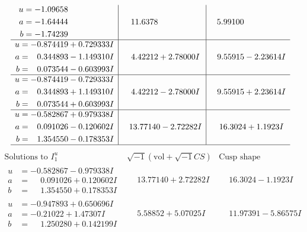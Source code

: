 \documentclass[1p]{elsarticle_modified}
\theoremstyle{definition}
\newcommand{\I}{\sqrt{-1}}
\begin{document}
$$\begin{array}{c|c|c}
\begin{aligned}
u &= -1.09658\phantom{ +0.000000I} \\
a &= -1.64444\phantom{ +0.000000I} \\
b &= -1.74239\phantom{ +0.000000I}\end{aligned}
 & \phantom{-}11.6378\phantom{ +0.000000I} & \phantom{-}5.99100\phantom{ +0.000000I} \\ \hline\begin{aligned}
u &= -0.874419 + 0.729333 I \\
a &= \phantom{-}0.344893 - 1.149310 I \\
b &= \phantom{-}0.073544 - 0.603993 I\end{aligned}
 & \phantom{-}4.42212 + 2.78000 I & \phantom{-}9.55915 - 2.23614 I \\ \hline\begin{aligned}
u &= -0.874419 - 0.729333 I \\
a &= \phantom{-}0.344893 + 1.149310 I \\
b &= \phantom{-}0.073544 + 0.603993 I\end{aligned}
 & \phantom{-}4.42212 - 2.78000 I & \phantom{-}9.55915 + 2.23614 I \\ \hline\begin{aligned}
u &= -0.582867 + 0.979338 I \\
a &= \phantom{-}0.091026 - 0.120602 I \\
b &= \phantom{-}1.354550 - 0.178353 I\end{aligned}
 & \phantom{-}13.77140 - 2.72282 I & \phantom{-}16.3024 + 1.1923 I\\
 \hline 
 \end{array}$$\newpage$$\begin{array}{c|c|c}  
\text{Solutions to }I^u_{1}& \I (\text{vol} + \sqrt{-1}CS) & \text{Cusp shape}\\
 \hline 
\begin{aligned}
u &= -0.582867 - 0.979338 I \\
a &= \phantom{-}0.091026 + 0.120602 I \\
b &= \phantom{-}1.354550 + 0.178353 I\end{aligned}
 & \phantom{-}13.77140 + 2.72282 I & \phantom{-}16.3024 - 1.1923 I \\ \hline\begin{aligned}
u &= -0.947893 + 0.650696 I \\
a &= -0.21022 + 1.47307 I \\
b &= \phantom{-}1.250280 + 0.142199 I\end{aligned}
 & \phantom{-}5.58852 + 5.07025 I & \phantom{-}11.97391 - 5.86575 I \\ \hline\begin{aligned}

\end{aligned}
\end{array}$$
\end{document}
